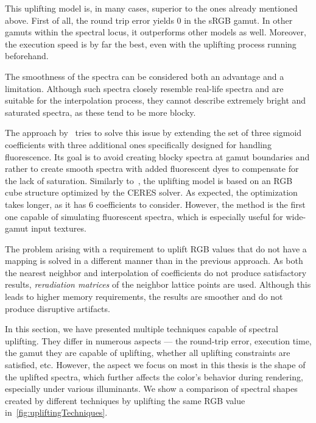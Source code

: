 This uplifting model is, in many cases, superior to the ones already mentioned above. First of all, the round trip error yields 0 in the sRGB gamut. In other gamuts within the spectral locus, it outperforms other models as well. Moreover, the execution speed is by far the best, even with the uplifting process running beforehand. 

The smoothness of the spectra can be considered both an advantage and a limitation. Although such spectra closely resemble real-life spectra and are suitable for the interpolation process, they cannot describe extremely bright and saturated spectra, as these tend to be more blocky.

The approach by~\citet{upsamplingFluorescence} tries to solve this issue by extending the set of three sigmoid coefficients with three additional ones specifically designed for handling fluorescence. Its goal is to avoid creating blocky spectra at gamut boundaries and rather to create smooth spectra with added fluorescent dyes to compensate for the lack of saturation. Similarly to~\citet{upsamplingJakobHanika}, the uplifting model is based on an RGB cube structure optimized by the CERES solver. As expected, the optimization takes longer, as it has 6 coefficients to consider. However, the method is the first one capable of simulating fluorescent spectra, which is especially useful for wide-gamut input textures.

The problem arising with a requirement to uplift RGB values that do not have a mapping is solved in a different manner than in the previous approach. As both the nearest neighbor and interpolation of coefficients do not produce satisfactory results, \emph{reradiation matrices} of the neighbor lattice points are used. Although this leads to higher memory requirements, the results are smoother and do not produce disruptive artifacts. 

In this section, we have presented multiple techniques capable of spectral uplifting. They differ in numerous aspects --- the round-trip error, execution time, the gamut they are capable of uplifting, whether all uplifting constraints are satisfied, etc. However, the aspect we focus on most in this thesis is the shape of the uplifted spectra, which further affects the color's behavior during rendering, especially under various illuminants. We show a comparison of spectral shapes created by different techniques by uplifting the same RGB value in~\cref{fig:upliftingTechniques}.


